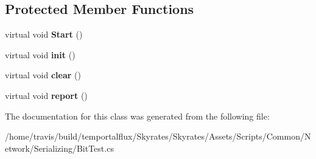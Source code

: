 \subsection*{Protected Member Functions}
\begin{DoxyCompactItemize}
\item 
\hypertarget{class_skyrates_1_1_common_1_1_network_1_1_test_1_1_bit_test_ad4ee42d0a1c391955859880eb26f690a}{virtual void {\bfseries Start} ()}\label{class_skyrates_1_1_common_1_1_network_1_1_test_1_1_bit_test_ad4ee42d0a1c391955859880eb26f690a}

\item 
\hypertarget{class_skyrates_1_1_common_1_1_network_1_1_test_1_1_bit_test_a5fc2422030ef427d0364483c53d8fda0}{virtual void {\bfseries init} ()}\label{class_skyrates_1_1_common_1_1_network_1_1_test_1_1_bit_test_a5fc2422030ef427d0364483c53d8fda0}

\item 
\hypertarget{class_skyrates_1_1_common_1_1_network_1_1_test_1_1_bit_test_aba4c131aa93287bcc5561e06fa957511}{virtual void {\bfseries clear} ()}\label{class_skyrates_1_1_common_1_1_network_1_1_test_1_1_bit_test_aba4c131aa93287bcc5561e06fa957511}

\item 
\hypertarget{class_skyrates_1_1_common_1_1_network_1_1_test_1_1_bit_test_a5fbca0310c98db4422403b19bcd79af6}{virtual void {\bfseries report} ()}\label{class_skyrates_1_1_common_1_1_network_1_1_test_1_1_bit_test_a5fbca0310c98db4422403b19bcd79af6}

\end{DoxyCompactItemize}


The documentation for this class was generated from the following file\-:\begin{DoxyCompactItemize}
\item 
/home/travis/build/temportalflux/\-Skyrates/\-Skyrates/\-Assets/\-Scripts/\-Common/\-Network/\-Serializing/Bit\-Test.\-cs\end{DoxyCompactItemize}
